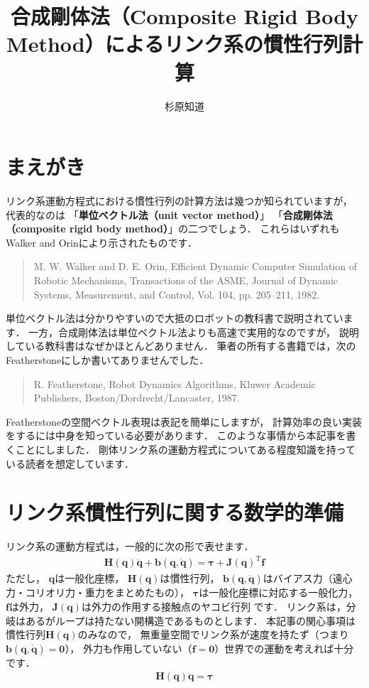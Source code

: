 \documentclass{jsarticle}
\title{\Large {\bf 合成剛体法（Composite Rigid Body Method）によるリンク系の慣性行列計算}}
\author{杉原知道}
\begin{document}
\maketitle

\section{まえがき}

リンク系運動方程式における慣性行列の計算方法は幾つか知られていますが，
代表的なのは
「{\bf 単位ベクトル法（unit vector method）}」
「{\bf 合成剛体法（composite rigid body method）}」の二つでしょう．
これらはいずれもWalker and Orinにより示されたものです．
\begin{quote}
M. W. Walker and D. E. Orin,
Efficient Dynamic Computer Simulation of Robotic Mechanisms,
Transactions of the ASME, Journal of Dynamic Systems, Measurement, and Control,
Vol. 104, pp. 205--211, 1982.
\end{quote}
単位ベクトル法は分かりやすいので大抵のロボットの教科書で説明されています．
一方，合成剛体法は単位ベクトル法よりも高速で実用的なのですが，
説明している教科書はなぜかほとんどありません．
筆者の所有する書籍では，次のFeatherstoneにしか書いてありませんでした．
\begin{quote}
R. Featherstone,
Robot Dynamics Algorithms,
Kluwer Academic Publishers, Boston/Dordrecht/Lancaster, 1987.
\end{quote}
Featherstoneの空間ベクトル表現は表記を簡単にしますが，
計算効率の良い実装をするには中身を知っている必要があります．
このような事情から本記事を書くことにしました．
剛体リンク系の運動方程式についてある程度知識を持っている読者を想定しています．


\section{リンク系慣性行列に関する数学的準備}

リンク系の運動方程式は，一般的に次の形で表せます．
\begin{align*}
\bm{H}(\bm{q})\ddot{\bm{q}}+\bm{b}(\bm{q},\dot{\bm{q}})=\bm{\tau}+\bm{J}(\bm{q})^{\mathrm{T}}\bm{f}
\end{align*}
ただし，
$\bm{q}$は一般化座標，
$\bm{H}(\bm{q})$は慣性行列，
$\bm{b}(\bm{q},\dot{\bm{q}})$はバイアス力（遠心力・コリオリ力・重力をまとめたもの），
$\bm{\tau}$は一般化座標に対応する一般化力，
$\bm{f}$は外力，
$\bm{J}(\bm{q})$は外力の作用する接触点のヤコビ行列
です．
リンク系は，分岐はあるがループは持たない開構造であるものとします．
本記事の関心事項は慣性行列$\bm{H}(\bm{q})$のみなので，
無重量空間でリンク系が速度を持たず（つまり$\bm{b}(\bm{q},\dot{\bm{q}})=\bm{0}$），
外力も作用していない（$\bm{f}=\bm{0}$）世界での運動を考えれば十分です．
\begin{align*}
\bm{H}(\bm{q})\ddot{\bm{q}}=\bm{\tau}
\end{align*}
\end{document}
